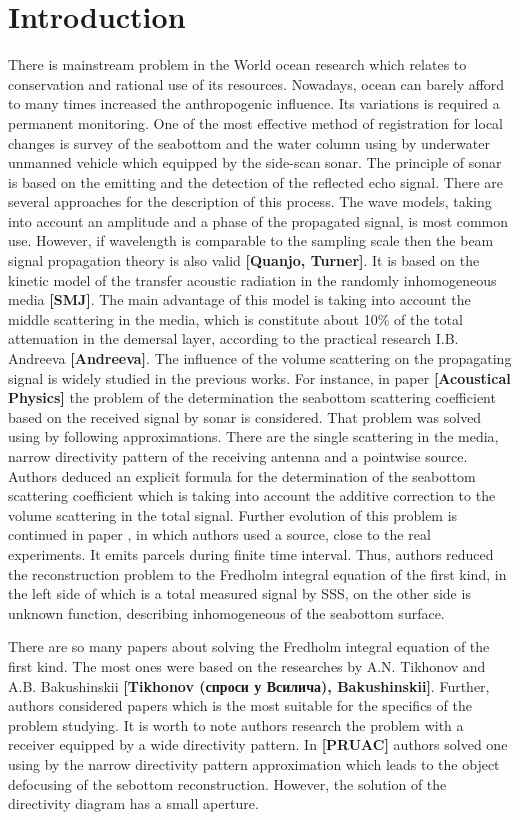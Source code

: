 \documentclass{procDDs}
\begin{document}
\section{Introduction}
There is mainstream problem in the World ocean research which relates to conservation and rational use of its resources. Nowadays, ocean can barely afford to many times increased the anthropogenic influence. Its variations is required a permanent monitoring. One of the most effective method of registration for local changes is survey of the seabottom and the water column using by underwater unmanned vehicle which equipped by the side-scan sonar. The principle of sonar is based on the emitting and the detection of the reflected echo signal. There are several approaches for the description of this process. The wave models, taking into account an amplitude and a phase of the propagated signal, is most common use. However, if wavelength is comparable to the sampling scale then the beam signal propagation theory is also valid \textbf{[Quanjo, Turner]}. It is based on the kinetic model of the transfer acoustic radiation in the randomly inhomogeneous media \textbf{[SMJ]}. The main advantage of this model is taking into account the middle scattering in the media, which is constitute about 10\% of the total attenuation in the demersal layer, according to the practical research I.B. Andreeva \textbf{[Andreeva]}. The influence of the volume scattering on the propagating signal is widely studied in the previous works. For instance, in paper \textbf{[Acoustical Physics]} the problem of the determination the seabottom scattering coefficient based on the received signal by sonar is considered. That problem was solved using by following approximations. There are the single scattering in the media, narrow directivity pattern of the receiving antenna and a pointwise source. Authors deduced an explicit formula for the determination of the seabottom scattering coefficient which is taking into account the additive correction to the volume scattering in the total signal. Further evolution of this problem is continued in paper \cite{SPIE_KOV}, in which authors used a source, close to the real experiments. It emits parcels during finite time interval. Thus, authors reduced the reconstruction problem to the Fredholm integral equation of the first kind, in the left side of which is a total measured signal by SSS,  on the other side is unknown function, describing inhomogeneous of the seabottom surface. 

There are so many papers about solving the Fredholm integral equation of the first kind. The most ones were based on the researches by A.N. Tikhonov and A.B. Bakushinskii \textbf{[Tikhonov (спроси у Всилича), Bakushinskii]}. Further, authors considered papers which is the most suitable for the specifics of the problem studying. It is worth to note authors research the problem with a receiver equipped by  a wide directivity pattern. In \textbf{[PRUAC]} authors solved one using by the narrow directivity pattern approximation which leads to the object defocusing of the sebottom reconstruction. However, the solution of the directivity diagram has a small aperture.
\end{document}
